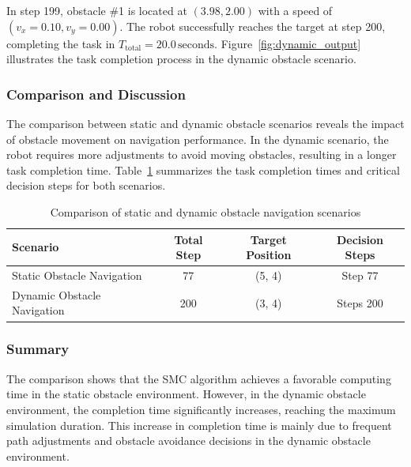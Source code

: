 In step 199, obstacle \#1 is located at \((3.98, 2.00)\) with a speed of \((v_x = 0.10, v_y = 0.00)\). The robot successfully reaches the target at step 200, completing the task in \(T_{\text{total}} = 20.0 \, \text{seconds}\). Figure~\ref{fig:dynamic_output} illustrates the task completion process in the dynamic obstacle scenario.


\subsubsection{Comparison and Discussion}

The comparison between static and dynamic obstacle scenarios reveals the impact of obstacle movement on navigation performance. In the dynamic scenario, the robot requires more adjustments to avoid moving obstacles, resulting in a longer task completion time. Table~\ref{tab:comparison} summarizes the task completion times and critical decision steps for both scenarios.


\begin{table}[H]
    \centering
    \caption{Comparison of static and dynamic obstacle navigation scenarios}
    \label{tab:comparison}
    \centering
    \begin{tabular}{|l|c|c|c|}
        \hline
        \textbf{Scenario} & \textbf{Total Step} & \textbf{Target Position} & \textbf{Decision Steps} \\ \hline
        Static Obstacle Navigation & 77 & (5, 4) & Step 77 \\ \hline
        Dynamic Obstacle Navigation & 200 & (3, 4) & Steps 200 \\ \hline
    \end{tabular}
\end{table}



\subsubsection{Summary}

The comparison shows that the SMC algorithm achieves a favorable computing time in the static obstacle environment. However, in the dynamic obstacle environment, the completion time significantly increases, reaching the maximum simulation duration. This increase in completion time is mainly due to frequent path adjustments and obstacle avoidance decisions in the dynamic obstacle environment.